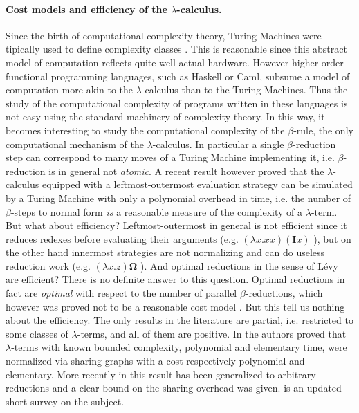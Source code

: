 \documentclass[english]{scrartcl}
\begin{document}
\paragraph{Cost models and efficiency of the $\lambda$-calculus.}Since the birth of computational complexity theory, Turing Machines were tipically used to define complexity classes \cite{hartmanis_computational_1965}. This is reasonable since this abstract model of computation reflects quite well actual hardware. However higher-order functional programming languages, such as Haskell or Caml, subsume a model of computation more akin to the $\lambda$-calculus than to the Turing Machines. Thus the study of the computational complexity of programs written in these languages is not easy using the standard machinery of complexity theory. In this way, it becomes interesting to study the computational complexity of the $\beta$-rule, the only computational mechanism of the $\lambda$-calculus. In particular a single $\beta$-reduction step can correspond to many moves of a Turing Machine implementing it, i.e. $\beta$-reduction is in general not \emph{atomic}. A recent result \cite{dal_lago_leftmost-outermost_2016} however proved that the $\lambda$-calculus equipped with a leftmost-outermost evaluation strategy can be simulated by a Turing Machine with only a polynomial overhead in time, i.e. the number of $\beta$-steps to normal form \emph{is} a reasonable measure of the complexity of a $\lambda$-term. But what about efficiency? Leftmost-outermost in general is not efficient since it reduces redexes before evaluating their arguments (e.g. $(\lambda x.xx)(\mathbf{I}x)$ ), but on the other hand innermost strategies are not normalizing and can do useless reduction work (e.g. $(\lambda x.z)\bm{\Omega}$ ). And optimal reductions in the sense of Lévy are efficient? There is no definite answer to this question. Optimal reductions in fact are \emph{optimal} with respect to the number of parallel $\beta$-reductions, which however was proved not to be a reasonable cost model \cite{lawall_optimality_1996, asperti_parallel_2001, asperti_optimal_2004}. But this tell us nothing about the efficiency. The only results in the literature are partial, i.e. restricted to some classes of $\lambda$-terms, and all of them are positive. In \cite{baillot_light_2011} the authors proved that $\lambda$-terms with known bounded complexity, polynomial and elementary time, were normalized via sharing graphs with a cost respectively polynomial and elementary. More recently in \cite{guerrini_is_2017} this result has been generalized to arbitrary reductions and a clear bound on the sharing overhead was given. \cite{asperti_about_2017} is an updated short survey on the subject.
\end{document}
